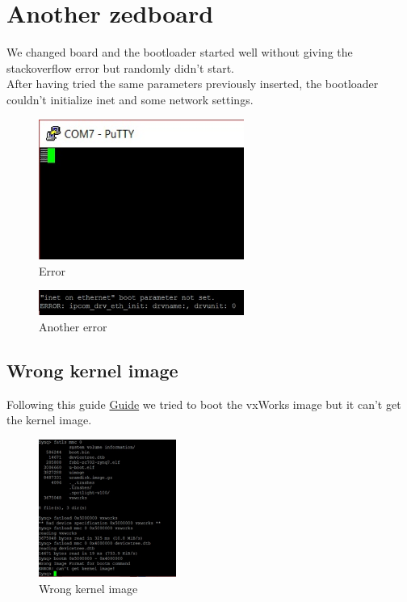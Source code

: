 \chapter{Another zedboard} 
\label{ch:anotherzedboard} 

We changed board and the bootloader started well without giving the stackoverflow error but randomly didn’t start.\\
After having tried the same parameters previously inserted, the bootloader couldn’t  initialize inet and some network settings.

\begin{figure}[h]
	\centering		\includegraphics[width=0.6\textwidth]{img/error1}
	\caption{Error}
    	\label{fig:error1}
\end{figure}

\begin{figure}[h]
	\centering		\includegraphics[width=0.6\textwidth]{img/error2}
	\caption{Another error}
    	\label{fig:error2}
\end{figure}

\section{Wrong kernel image}

Following this guide 
\href{https://www.xilinx.com/support/documentation/application_notes/xapp1258-vxworks-7-bsp.pdf}{Guide}
we tried to boot the vxWorks image but it can’t get the kernel image.
\begin{figure}[h]
	\centering		\includegraphics[width=0.4\textwidth]{img/error3}
	\caption{Wrong kernel image}
    	\label{fig:error3}
\end{figure}

